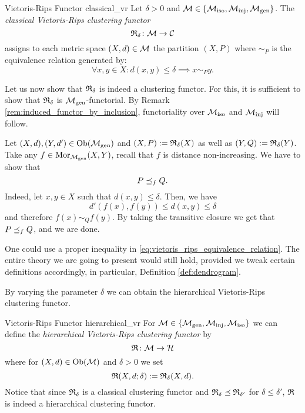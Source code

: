 \begin{example}{Vietoris-Rips Functor \cite[Def.~6.1]{Carlsson2010}}{classical_vr}
    Let $\delta > 0$ and $\mathcal{M} \in \{{\mathcal{M}_\mathrm{iso}}, {\mathcal{M}_\mathrm{inj}}, {\mathcal{M}_\mathrm{gen}}\}$. The \emph{classical Vietoris-Rips clustering functor}
    $$
    \mathfrak{R}_\delta\colon \mathcal{M} \to \mathcal{C}
    $$
    assigns to each metric space $(X,d) \in \mathcal{M}$ the partition $(X,P)$ where $\sim_P$ is the equivalence relation generated by:
    \begin{equation}
        \label{eq:vietoris_rips_equivalence_relation}
        \forall x,y \in X: d(x,y) \leq \delta \implies x \sim_P y.
    \end{equation}

    Let us now show that $\mathfrak{R}_\delta$ is indeed a clustering functor.
    For this, it is sufficient to show that $\mathfrak{R}_\delta$ is ${\mathcal{M}_\mathrm{gen}}$-functorial. By Remark \ref{rem:induced_functor_by_inclusion}, functoriality over ${\mathcal{M}_\mathrm{iso}}$ and ${\mathcal{M}_\mathrm{inj}}$ will follow.
    \medskip

    Let $(X,d),(Y,d') \in \mathrm {Ob}({\mathcal{M}_\mathrm{gen}})$ and $(X,P) := \mathfrak{R}_\delta(X)$ as well as $(Y,Q) := \mathfrak{R}_\delta(Y)$.
    Take any $f \in \mathrm {Mor}_{\mathcal{M}_\mathrm{gen}}(X,Y)$, recall that $f$ is distance non-increasing.
    We have to show that 
    $$P \preceq_f Q.$$
    Indeed, let $x,y \in X$ such that $d(x,y) \leq \delta$.
    Then, we have
    $$
    d'(f(x), f(y)) \leq d(x,y) \leq \delta
    $$
    and therefore $f(x) \sim_{Q} f(y)$.
    By taking the transitive closure we get that $P \preceq_f Q$, and we are done.
\end{example}

\begin{myremark}{}{}
One could use a proper inequality in \eqref{eq:vietoris_rips_equivalence_relation}. The entire theory we are going to present would still hold, provided we tweak certain definitions accordingly, in particular, Definition \ref{def:dendrogram}.
\end{myremark}

By varying the parameter $\delta$ we can obtain the hierarchical Vietoris-Rips clustering functor.

\begin{example}{Vietoris-Rips Functor \cite[Ex.~7.1]{Carlsson2010}}{hierarchical_vr}
For $\mathcal{M} \in \{{\mathcal{M}_\mathrm{gen}},{\mathcal{M}_\mathrm{inj}},{\mathcal{M}_\mathrm{iso}}\}$ we can define the \emph{hierarchical Vietoris-Rips clustering functor} by
$$
\mathfrak{R}\colon \mathcal{M} \to \mathcal{H}
$$
where for $(X,d) \in \mathrm {Ob}(\mathcal{M})$ and $\delta > 0$ we set
$$
\mathfrak{R}(X,d; \delta) := \mathfrak{R}_\delta(X,d).
$$
Notice that since $\mathfrak{R}_\delta$ is a classical clustering functor and $\mathfrak{R}_\delta \preceq \mathfrak{R}_{\delta'}$ for $\delta \leq \delta'$, $\mathfrak{R}$ is indeed a hierarchical clustering functor.
\end{example}

